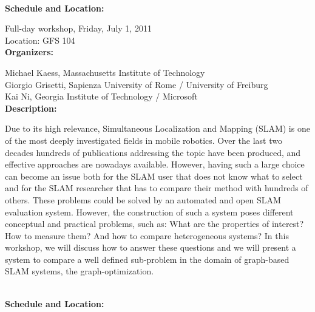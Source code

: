 {%
\\[5mm]

{\bf  Schedule and Location:}

Full-day workshop, Friday, July 1, 2011\\
Location: GFS 104 \\[4mm]

{\bf  Organizers:}

Michael Kaess, Massachusetts Institute of Technology\\
Giorgio Grisetti, Sapienza University of Rome / University of Freiburg\\
Kai Ni, Georgia Institute of Technology / Microsoft\\[4mm]


{\bf Description: }

Due to its high relevance, Simultaneous Localization and Mapping (SLAM) is one of the most deeply investigated fields in mobile robotics. Over the last two decades hundreds of publications addressing the topic have been produced, and effective approaches are nowadays available. However, having such a large choice can become an issue both for the SLAM user that does not know what to select and for the SLAM researcher that has to compare their method with hundreds of others. These problems could be solved by an automated and open SLAM evaluation system. However, the construction of such a system poses different conceptual and practical problems, such as: What are the properties of interest? How to measure them? And how to compare heterogeneous systems? In this workshop, we will discuss how to answer these questions and we will present a system to compare a well defined sub-problem in the domain of graph-based SLAM systems, the graph-optimization.



\\[5mm]

{\bf  Schedule and Location:}

}
